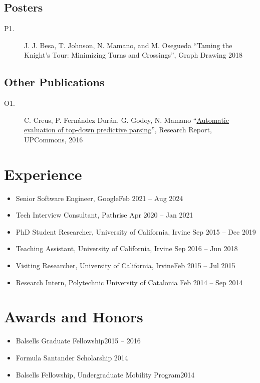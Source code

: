 \documentclass[letterpaper,10pt,oneside]{article}
\begin{document}
\subsection*{Posters}
\begin{description}
	\item[P1.] J. J. Besa, T. Johnson, N. Mamano, and M. Osegueda ``Taming the Knight’s Tour: Minimizing Turns and Crossings'', Graph Drawing 2018
\end{description}
\subsection*{Other Publications }
\begin{description}
	\item[O1.] C. Creus, P. Fernández Durán, G. Godoy, N. Mamano
	 ``\href{https://upcommons.upc.edu/bitstream/handle/2117/119781/Automatic\%20evaluation\%20of\%20top-down\%20predictive\%20parsing.pdf?sequence=1\&isAllowed=y}{Automatic evaluation of top-down predictive parsing}'', Research Report, UPCommons, 2016
\end{description}

\section*{Experience}
\begin{itemize}
	\item Senior Software Engineer, Google\hfill Feb 2021 -- Aug 2024
	\item Tech Interview Consultant, Pathrise \hfill Apr 2020 -- Jan 2021
	\item PhD Student Researcher, University of California, Irvine \hfill Sep 2015 -- Dec 2019
	\item Teaching Assistant, University of California, Irvine \hfill Sep 2016 -- Jun 2018
	\item Visiting Researcher, University of California, Irvine\hfill Feb 2015 -- Jul 2015
  \item Research Intern, Polytechnic University of Catalonia \hfill Feb 2014 -- Sep 2014
\end{itemize}

\section*{Awards and Honors}
\begin{itemize}
	\item Balsells Graduate Fellowship\hfill 2015 -- 2016
	\item Formula Santander Scholarship \hfill 2014
	\item Balsells Fellowship, Undergraduate Mobility Program\hfill 2014
\end{itemize}
\end{document}
